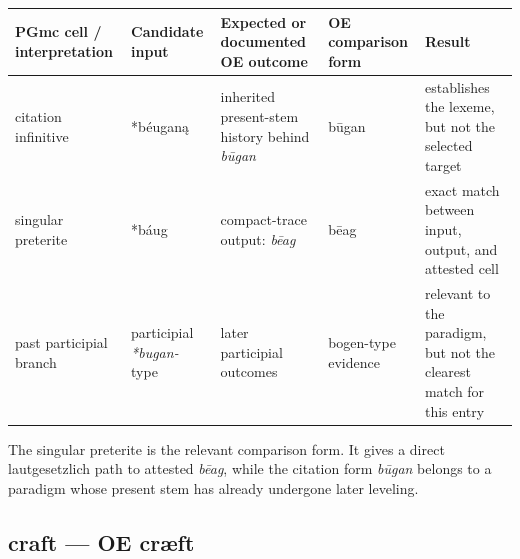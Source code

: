 \documentclass[
  british,
  a4paper,
]{article}
\newcounter{none} %
\begin{document}
{\def\LTcaptype{none} %
\begin{longtable}[]{@{}
  >{\raggedright\arraybackslash}p{}
  >{\raggedright\arraybackslash}p{}
  >{\raggedright\arraybackslash}p{}
  >{\raggedright\arraybackslash}p{}
  >{\raggedright\arraybackslash}p{}@{}}
\toprule\noalign{}
\begin{minipage}[b]{\linewidth}\raggedright
PGmc cell / interpretation
\end{minipage} & \begin{minipage}[b]{\linewidth}\raggedright
Candidate input
\end{minipage} & \begin{minipage}[b]{\linewidth}\raggedright
Expected or documented OE outcome
\end{minipage} & \begin{minipage}[b]{\linewidth}\raggedright
OE comparison form
\end{minipage} & \begin{minipage}[b]{\linewidth}\raggedright
Result
\end{minipage} \\
\midrule\noalign{}
\endhead
\bottomrule\noalign{}
\endlastfoot
citation infinitive & *béuganą & inherited present-stem history behind
\emph{būgan} & būgan & establishes the lexeme, but not the selected
target \\
singular preterite & *báug & compact-trace output: \emph{bēag} & bēag &
exact match between input, output, and attested cell \\
past participial branch & participial \emph{*bugan-} type & later
participial outcomes & bogen-type evidence & relevant to the paradigm,
but not the clearest match for this entry \\
\end{longtable}
}

The singular preterite is the relevant comparison form. It gives a
direct lautgesetzlich path to attested \emph{bēag}, while the citation
form \emph{būgan} belongs to a paradigm whose present stem has already
undergone later leveling.

\subsection{craft --- OE cræft}\label{craft-oe-cruxe6ft}
\end{document}
